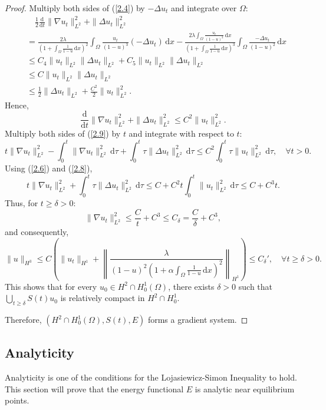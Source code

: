 \documentclass{article}
\numberwithin{equation}{section}
\begin{document}
\begin{proof}
Multiply both sides of (\ref{2.4}) by $-\Delta u_t$ and integrate over $\Omega$:
\begin{align*}
    &\quad\frac{1}{2}\frac{\mathrm{d}}{\mathrm{d}t}\|\nabla u_t\|_{L^2}^2+\|\Delta u_t\|_{L^2}^2\\
    &= \frac{2\lambda}{(1+\int_{\Omega}\frac{1}{1-u}\,\mathrm{d}x)^2}\int_{\Omega}\frac{u_{t}}{(1-u)^3}(-\Delta u_t)\,\mathrm{d}x-\frac{2\lambda\int_{\Omega}\frac{u_t}{(1-u)^2}\,\mathrm{d}x}{(1+\int_{\Omega}\frac{1}{1-u}\,\mathrm{d}x)^3}\int_{\Omega}\frac{-\Delta u_t}{(1-u)^2}\,\mathrm{d}x\\
    &\le C_4\|u_t\|_{L^2}\|\Delta u_t\|_{L^2}+C_5\|u_t\|_{L^2}\|\Delta u_t\|_{L^2}\\
    &\le C\|u_t\|_{L^2}\|\Delta u_t\|_{L^2}\\
    &\le \frac{1}{2}\|\Delta u_t\|_{L^2}+\frac{C^2}{2}\|u_t\|_{L^2}^2.
\end{align*}
Hence,
\begin{equation}
    \frac{\mathrm{d}}{\mathrm{d}t}\|\nabla u_t\|_{L^2}^2+\|\Delta u_t\|_{L^2}^2\le C^2\|u_t\|_{L^2}^2.\label{2.9}
\end{equation}
Multiply both sides of (\ref{2.9}) by $t$ and integrate with respect to $t$:
$$t\|\nabla u_t\|_{L^2}^2-\int_{0}^{t}\|\nabla u_t\|_{L^2}^2\,\mathrm{d}\tau+\int_{0}^{t}\tau\|\Delta u_t\|_{L^2}^2\,\mathrm{d}\tau\le C^2\int_{0}^{t}\tau\|u_t\|_{L^2}^2\,\mathrm{d}\tau,\quad \forall t>0.$$
Using (\ref{2.6}) and (\ref{2.8}),
$$t\|\nabla u_t\|_{L^2}^2+\int_{0}^{t}\tau\|\Delta u_t\|_{L^2}^2\,\mathrm{d}\tau\le C+C^2t\int_{0}^{t}\|u_t\|_{L^2}^2\,\mathrm{d}\tau\le C+C^3t.$$
Thus, for $t\ge\delta>0$:
$$\|\nabla u_t\|_{L^2}^2\le \frac{C}{t}+C^3\le C_{\delta}=\frac{C}{\delta}+C^3,$$
and consequently,
$$\|u\|_{H^3}\le C\left(\|u_t\|_{H^1}+\left\|\frac{\lambda}{(1-u)^2(1+\alpha\int_{\Omega}\frac{1}{1-u}\,\mathrm{d}x)^2}\right\|_{H^1}\right)\le {C_{\delta}}',\quad \forall t\ge\delta>0.$$
This shows that for every $u_0\in H^2\cap H_0^1(\Omega)$, there exists $\delta>0$ such that $\bigcup_{t\ge \delta}S(t)u_0$ is relatively compact in $H^2\cap H_0^1$.

Therefore, $(H^2\cap H_0^1(\Omega),S(t),E)$ forms a gradient system.
\end{proof}

\subsection{Analyticity}

\qquad Analyticity is one of the conditions for the Lojasiewicz-Simon Inequality to hold. This section will prove that the energy functional $E$ is analytic near equilibrium points.
\end{document}
